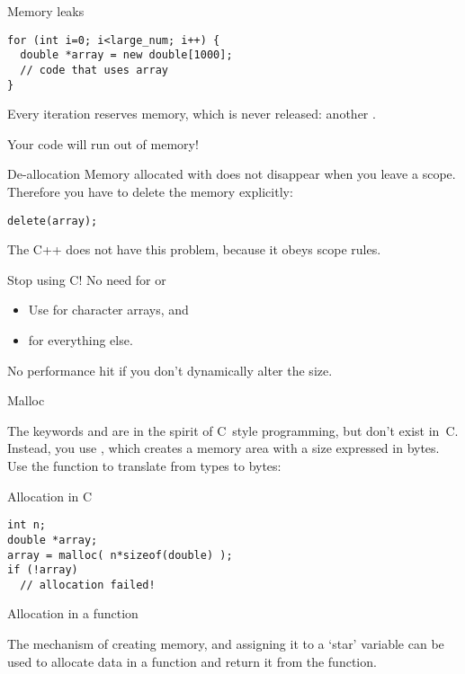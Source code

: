 \begin{block}{Memory leaks}
  \label{sl:leak2}
\begin{verbatim}
for (int i=0; i<large_num; i++) {
  double *array = new double[1000];
  // code that uses array
}
\end{verbatim}
  Every iteration reserves memory, which is never released:
  another .

  Your code will run out of memory!
\end{block}

\begin{block}{De-allocation}
  \label{sl:c-array-del}
  Memory allocated with  does not disappear when you leave a
  scope. Therefore you have to delete the memory explicitly:
\begin{verbatim}
delete(array);
\end{verbatim}
The C++  does not have this problem, because it obeys scope rules.
\end{block}

\begin{block}{Stop using C!}
  \label{sl:no-c-malloc}
  No need for  or 
  \begin{itemize}
  \item Use  for character arrays, and
  \item {} for everything else.
  \end{itemize}
  No performance hit if you don't dynamically alter the size.
\end{block}

 {Malloc}

The keywords  and  are in the spirit of C~style
programming, but don't exist in~C. Instead, you use
, which creates a memory area with a size
expressed in bytes. Use the function  to translate
from types to bytes:

\begin{block}{Allocation in C}
\begin{verbatim}
int n;
double *array;
array = malloc( n*sizeof(double) );
if (!array)
  // allocation failed!
\end{verbatim}
\end{block}

 {Allocation in a function}

The mechanism of creating memory, and assigning it to a `star'
variable
can be used to allocate data in a function and
return it from the function.

